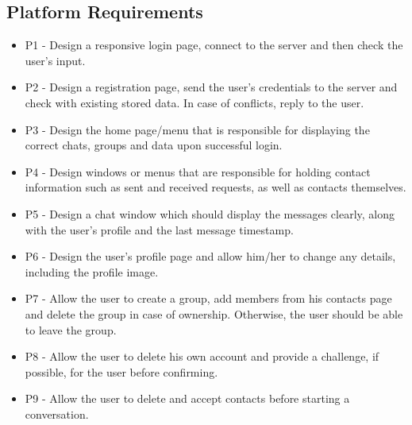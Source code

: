 \documentclass{article}
\begin{document}
	\subsection{Platform Requirements}
	\begin{itemize}
		\item P1 - Design a responsive login page, connect to the server and then check the user's input.
		\item P2 - Design a registration page, send the user's credentials to the server and check with existing stored data. In case of conflicts, reply to the user.
		\item P3 - Design the home page/menu that is responsible for displaying the correct chats, groups and data upon successful login.
		\item P4 - Design windows or menus that are responsible for holding contact information such as sent and received requests, as well as contacts themselves.
		\item P5 - Design a chat window which should display the messages clearly, along with the user's profile and the last message timestamp.
		\item P6 - Design the user's profile page and allow him/her to change any details, including the profile image.
		\item P7 - Allow the user to create a group, add members from his contacts page and delete the group in case of ownership. Otherwise, the user should be able to leave the group.
		\item P8 - Allow the user to delete his own account and provide a challenge, if possible, for the user before confirming.
		\item P9 - Allow the user to delete and accept contacts before starting a conversation.
	\end{itemize}
\end{document}
